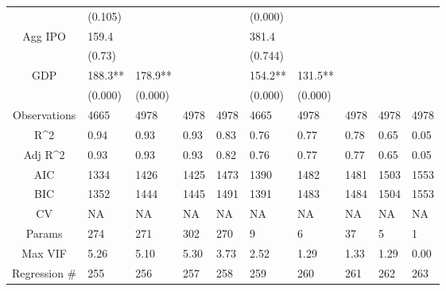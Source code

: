 \documentclass{article}
\begin{document}
\begin{table}[H]
\begin{tabular}{|clllllllll|}
   & (0.105) &  &  &  & (0.000) &  &  &  &  \\
  Agg IPO & 159.4 &  &  &  & 381.4 &  &  &  &  \\
   & (0.73) &  &  &  & (0.744) &  &  &  &  \\
  GDP & 188.3** & 178.9** &  &  & 154.2** & 131.5** &  &  &  \\
   & (0.000) & (0.000) &  &  & (0.000) & (0.000) &  &  &  \\
  \hline
 Observations & 4665 & 4978 & 4978 & 4978 & 4665 & 4978 & 4978 & 4978 & 4978 \\
  R^2 & 0.94 & 0.93 & 0.93 & 0.83 & 0.76 & 0.77 & 0.78 & 0.65 & 0.05 \\
  Adj R^2 & 0.93 & 0.93 & 0.93 & 0.82 & 0.76 & 0.77 & 0.77 & 0.65 & 0.05 \\
  AIC & 1334 & 1426 & 1425 & 1473 & 1390 & 1482 & 1481 & 1503 & 1553 \\
  BIC & 1352 & 1444 & 1445 & 1491 & 1391 & 1483 & 1484 & 1504 & 1553 \\
  CV & NA & NA & NA & NA & NA & NA & NA & NA & NA \\
  Params & 274 & 271 & 302 & 270 & 9 & 6 & 37 & 5 & 1 \\
  Max VIF & 5.26 & 5.10 & 5.30 & 3.73 & 2.52 & 1.29 & 1.33 & 1.29 & 0.00 \\
  Regression \# & 255 & 256 & 257 & 258 & 259 & 260 & 261 & 262 & 263 \\
   \hline
\end{tabular}

\end{table}
\end{document}

